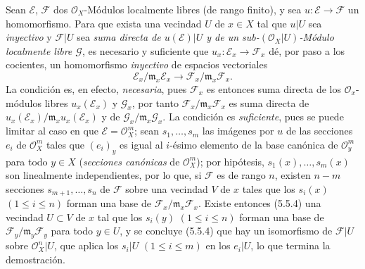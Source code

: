 \begin{env}[5.5.5]
\label{0.5.5.5-fr}
Sean $\mathcal{E}$, $\mathcal{F}$ dos $\mathcal{O}_X$-Módulos localmente
libres (de rango finito), y sea $u:\mathcal{E}\to\mathcal{F}$ un
homomorfismo. Para que exista una vecindad $U$ de $x\in X$ tal que $u|U$
sea \emph{inyectivo} y $\mathcal{F}|U$ sea \emph{suma directa de
$u(\mathcal{E})|U$ y de un sub-$(\mathcal{O}_X|U)$-Módulo localmente libre
$\mathcal{G}$}, es necesario y suficiente que
$u_x:\mathcal{E}_x\to\mathcal{F}_x$ dé, por paso a los cocientes, un
homomorfismo \emph{inyectivo} de espacios vectoriales
\[
  \mathcal{E}_x/\mathfrak{m}_x\mathcal{E}_x
  \longrightarrow
  \mathcal{F}_x/\mathfrak{m}_x\mathcal{F}_x.
\]
La condición es, en efecto, \emph{necesaria}, pues $\mathcal{F}_x$ es entonces
suma directa de los $\mathcal{O}_x$-módulos libres $u_x(\mathcal{E}_x)$ y
$\mathcal{G}_x$, por tanto $\mathcal{F}_x/\mathfrak{m}_x\mathcal{F}_x$ es suma
directa de
$u_x(\mathcal{E}_x)/\mathfrak{m}_x u_x(\mathcal{E}_x)$ y de
$\mathcal{G}_x/\mathfrak{m}_x\mathcal{G}_x$. La condición es
\emph{suficiente}, pues se puede limitar al caso en que
$\mathcal{E}=\mathcal{O}_X^m$; sean $s_1,\ldots,s_m$ las imágenes por $u$ de las
secciones $e_i$ de $\mathcal{O}_X^m$ tales que $(e_i)_y$ es igual al $i$-ésimo
elemento de la base canónica de $\mathcal{O}_y^m$ para todo $y\in X$
(\emph{secciones canónicas} de $\mathcal{O}_X^m$); por hipótesis,
$s_1(x),\ldots,s_m(x)$ son linealmente independientes, por lo que, si $\mathcal{F}$
es de rango $n$, existen $n-m$ secciones $s_{m+1},\ldots,s_n$ de
$\mathcal{F}$ sobre una vecindad $V$ de $x$ tales que los $s_i(x)$
$(1\leq i\leq n)$ forman una base de
$\mathcal{F}_x/\mathfrak{m}_x\mathcal{F}_x$. Existe entonces (5.5.4) una
vecindad $U\subset V$ de $x$ tal que los $s_i(y)$ $(1\leq i\leq n)$ forman
una base de $\mathcal{F}_y/\mathfrak{m}_y\mathcal{F}_y$ para todo $y\in U$,
y se concluye (5.5.4) que hay un isomorfismo de $\mathcal{F}|U$ sobre
$\mathcal{O}_X^n|U$, que aplica los $s_i|U$ $(1\leq i\leq m)$ en los
$e_i|U$, lo que termina la demostración.
\end{env}

